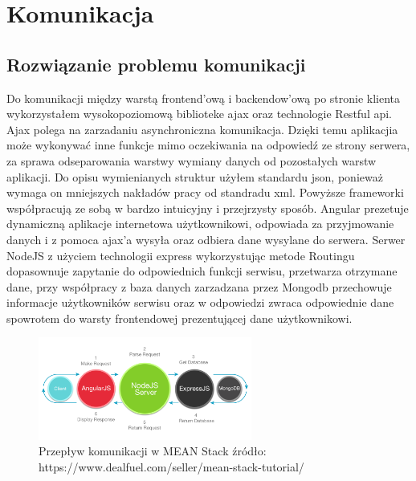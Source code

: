 \documentclass[12pt]{report}
\begin{document}
\section{Komunikacja}

\subsection{Rozwiązanie problemu komunikacji}
Do komunikacji między warstą frontend'ową i backendow'ową po stronie klienta wykorzystałem wysokopoziomową biblioteke ajax oraz technologie Restful api. 
Ajax polega na zarzadaniu asynchroniczna komunikacja. 
Dzięki temu aplikacjia może wykonywać inne funkcje mimo oczekiwania na odpowiedź ze strony serwera, za sprawa odseparowania warstwy wymiany danych od pozostałych warstw aplikacji.
Do opisu wymienianych struktur użyłem standardu json, ponieważ wymaga on mniejszych nakładów pracy od standradu xml. 
Powyższe frameworki współpracują ze sobą w bardzo intuicyjny i przejrzysty sposób. 
Angular prezetuje dynamiczną aplikacje internetowa użytkownikowi, odpowiada za przyjmowanie danych i z pomoca ajax'a wysyła oraz odbiera dane wysylane do serwera. 
Serwer NodeJS z użyciem technologii express wykorzystując metode Routingu dopasownuje zapytanie do odpowiednich funkcji serwisu, przetwarza otrzymane dane, przy współpracy z baza danych zarzadzana przez Mongodb przechowuje informacje użytkowników serwisu oraz w odpowiedzi zwraca odpowiednie dane spowrotem do warsty frontendowej prezentującej dane użytkownikowi. 

\begin{figure}[!t]
\centering
\includegraphics[width=7cm]{Meanex.png} 
\caption{Przepływ komunikacji w MEAN Stack źródło: https://www.dealfuel.com/seller/mean-stack-tutorial/}
\end{figure}
\end{document}

